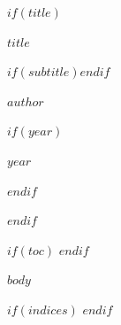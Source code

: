 \documentclass[$if(fontsize)$$fontsize$$else$11pt$endif$,openany,twoside]{memoir}
\begin{document}

$if(title)$
\frontmatter
\thispagestyle{empty}
\begin{center}
  \vspace*{40mm}
  {\Huge\bfseries $title$\par}
  $if(subtitle)$\vspace{8pt}{\Large $subtitle$\par}$endif$
  \vspace{20mm}
  {\large $author$\par}
  \vfill
  $if(year)${\small $year$\par}$endif$
\end{center}
\clearpage
$endif$

$if(toc)$
\tableofcontents*
\clearpage
$endif$

\mainmatter

$body$

$if(indices)$
\backmatter
\printindex
$endif$
\end{document}

